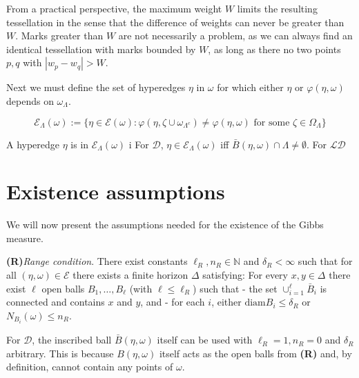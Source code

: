 \documentclass[12pt,a4paper]{report}
\begin{document}
From a practical perspective, the maximum weight $W$ limits the resulting tessellation in the sense that the difference of weights can never be greater than $W$. Marks greater than $W$ are not necessarily a problem, as  we can always find an identical tessellation with marks bounded by $W$, as long as there no two points $p,q$ with $|w_p-w_q|>W$.


Next we must define the set of hyperedges $\eta$ in $\omega$ for which either $\eta$ or $\varphi(\eta,\omega)$ depends on $\omega_\Lambda$.

$$\mathcal E_\Lambda(\omega) := \{ \eta \in \mathcal E(\omega): \varphi(\eta,\zeta \cup \omega_{\Lambda^c}) \neq \varphi(\eta,\omega) \text{ for some } \zeta \in \Omega_\Lambda \}$$

A hyperedge $\eta$ is in $\mathcal E_\Lambda(\omega)$ i
For $\mathcal D$, $\eta \in \mathcal E_\Lambda(\omega)$ iff $\bar B(\eta,\omega) \cap \Lambda \neq \emptyset$. 
For $\mathcal {LD}$ 



\section{Existence assumptions}
We will now present the assumptions needed for the existence of the Gibbs measure.

\textbf{(R)}\textit{Range condition}. There exist constants $\ell_R,n_R \in \mathbb N$ and $\delta_R < \infty$ such that for all $(\eta,\omega) \in \mathcal E$ there exists a finite horizon $\Delta$ satisfying: For every $x,y \in \Delta$ there exist $\ell$ open balls $B_1, \dots, B_\ell$ (with $\ell \leq \ell_R$) such that \newline
- the set $\cup^\ell_{i=1} \bar B_i$ is connected and contains $x$ and $y$, and \newline
- for each $i$, either $\text{diam} B_i \leq \delta_R$ or $N_{B_i}(\omega) \leq n_R$.

 For $\mathcal D$, the inscribed ball $\bar B(\eta,\omega)$ itself can be used with $\ell_R = 1, n_R = 0$ and $\delta_R$ arbitrary. This is because $B(\eta,\omega)$ itself acts as the open balls from \textbf{(R)} and, by definition, cannot contain any points of $\omega$.
\end{document}
